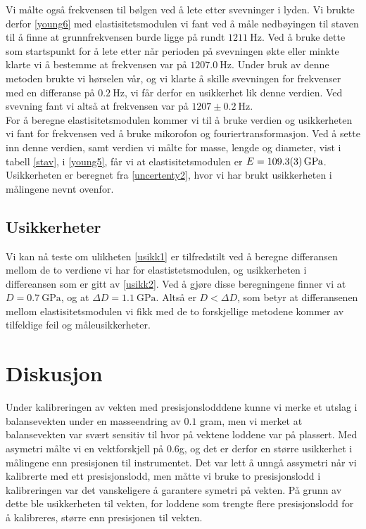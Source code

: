 \documentclass[%
 reprint,
 amsmath,amssymb,
 aps,
 norsk,
 booktabs
]{revtex4-1}
\begin{document}
Vi målte også frekvensen til bølgen ved å lete etter svevninger i lyden. Vi brukte derfor \eqref{young6} med elastisitetsmodulen vi fant ved å måle nedbøyingen til staven til å finne at grunnfrekvensen burde ligge på rundt $\SI{1211}{\hertz}$. Ved å bruke dette som startspunkt for å lete etter når perioden på svevningen økte eller minkte klarte vi å bestemme at frekvensen var på $\SI{1207.0}{\hertz}$. Under bruk av denne metoden brukte vi hørselen vår, og vi klarte å skille svevningen for frekvenser med en differanse på $\SI{0.2}{\hertz}$, vi får derfor en usikkerhet lik denne verdien. Ved svevning fant vi altså at frekvensen var på $1207\pm\SI{0.2}{\hertz}$.\\
For å beregne elastisitetsmodulen kommer vi til å bruke verdien og usikkerheten vi fant for frekvensen ved å bruke mikorofon og fouriertransformasjon. Ved å sette inn denne verdien, samt verdien vi målte for masse, lengde og diameter, vist i tabell \vref{stav}, i \eqref{young5}, får vi at elastisitetsmodulen er $E = \SI{109.3\pm0.3}{\giga\pascal}$. Usikkerheten er beregnet fra \eqref{uncertenty2}, hvor vi har brukt usikkerheten i målingene nevnt ovenfor.
\subsection{Usikkerheter}
Vi kan nå teste om ulikheten \eqref{usikk1} er tilfredstilt ved å beregne differansen mellom de to verdiene vi har for elastistetsmodulen, og usikkerheten i differeansen som er gitt av \eqref{usikk2}. Ved å gjøre disse beregningene finner vi at $D = \SI{0.7}{\giga\pascal}$, og at $\Delta D = \SI{1.1}{\giga\pascal}$. Altså er $D<\Delta D$, som betyr at differansenen mellom elastisitetsmodulen vi fikk med de to forskjellige metodene kommer av tilfeldige feil og måleusikkerheter.
\section{Diskusjon}
Under kalibreringen av vekten med presisjonslodddene kunne vi merke et utslag i balansevekten under en masseendring av $0.1$ gram, men vi merket at balansevekten var svært sensitiv til hvor på vektene loddene var på plassert. Med asymetri målte vi en vektforskjell på $0.6$g, og det er derfor en større usikkerhet i målingene enn presisjonen til instrumentet. Det var lett å unngå assymetri når vi kalibrerte med ett presisjonslodd, men måtte vi bruke to presisjonslodd i kalibreringen var det vanskeligere å garantere symetri på vekten. På grunn av dette ble usikkerheten til vekten, for loddene som trengte flere presisjonslodd for å kalibreres, større enn presisjonen til vekten.\\
\end{document}
